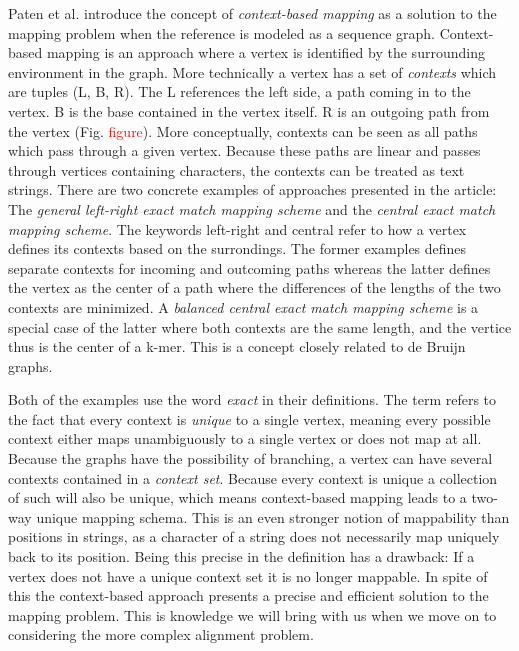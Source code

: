 \documentclass[thesis.tex]{subfiles}
\begin{document}
Paten et al. \cite{mapping_to_a_reference_genome_structure} introduce the concept of \textit{context-based mapping} as a solution to the mapping problem when the reference is modeled as a sequence graph. Context-based mapping is an approach where a vertex is identified by the surrounding environment in the graph. More technically a vertex has a set of \textit{contexts} which are tuples (L, B, R). The L references the left side, a path coming in to the vertex. B is the base contained in the vertex itself. R is an outgoing path from the vertex (Fig. \textcolor{red}{figure}). More conceptually, contexts can be seen as all paths which pass through a given vertex. Because these paths are linear and passes through vertices containing characters, the contexts can be treated as text strings. There are two concrete examples of approaches presented in the article: The \textit{general left-right exact match mapping scheme} and the \textit{central exact match mapping scheme}. The keywords left-right and central refer to how a vertex defines its contexts based on the surrondings. The former examples defines separate contexts for incoming and outcoming paths whereas the latter defines the vertex as the center of a path where the differences of the lengths of the two contexts are minimized. A  \textit{balanced central exact match mapping scheme} is a special case of the latter where both contexts are the same length, and the vertice thus is the center of a k-mer. This is a concept closely related to de Bruijn graphs.\\
\par\noindent
Both of the examples use the word \textit{exact} in their definitions. The term refers to the fact that every context is \textit{unique} to a single vertex, meaning every possible context either maps unambiguously to a single vertex or does not map at all. Because the graphs have the possibility of branching, a vertex can have several contexts contained in a \textit{context set}. Because every context is unique a collection of such will also be unique, which means context-based mapping leads to a two-way unique mapping schema. This is an even stronger notion of mappability than positions in strings, as a character of a string does not necessarily map uniquely back to its position. Being this precise in the definition has a drawback: If a vertex does not have a unique context set it is no longer mappable. In spite of this the context-based approach presents a precise and efficient solution to the mapping problem. This is knowledge we will bring with us when we move on to considering the more complex alignment problem.
\end{document}

